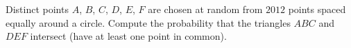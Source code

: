 Distinct points $A$, $B$, $C$, $D$, $E$, $F$ are chosen at random from $2012$ points spaced equally around a circle. Compute the probability that the triangles $ABC$ and $DEF$ intersect (have at least one point in common).
